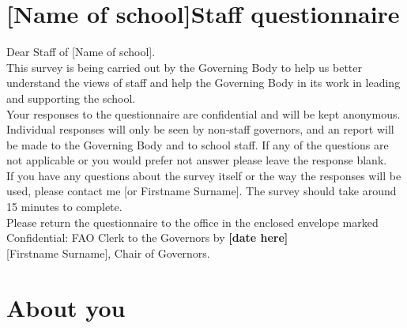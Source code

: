 \documentclass[a4paper, 11pt]{scrreprt}
\begin{document}
  \setcounter{page}{1}
  \begin{figure}[h]
  \centering
  \end{figure}
  \section*{[Name of school]Staff questionnaire}



Dear Staff of  [Name of school]. \\
This survey is being carried out by the Governing Body to help us better understand the views of staff and help the Governing Body in its work in leading and supporting the school.  \\
Your responses to the questionnaire are confidential and will be kept anonymous. Individual responses will only be seen by non-staff governors, and an report will be made to the Governing Body and to school staff. If any of the questions are not applicable or you would prefer not answer please leave the response blank. 
\\
If you have any questions about the survey itself or the way the responses will be used, please contact me [or Firstname Surname]. The survey should take around 15 minutes to complete. 
\\
Please return the questionnaire to the office in the enclosed envelope marked Confidential: FAO Clerk to the Governors by \textbf{[date here]}\\


[Firstname Surname], Chair of Governors. 


\newpage
\section*{About you}
\\
\\
\\
\\
\\
 \\
\\
\\
\\
\\
\end{document}
